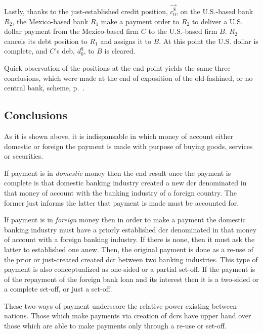 Lastly, thanks to the just-established credit position, $\overrightarrow{c^{\$}_{0}}$, on the U.S.-based bank $R_2$, the Mexico-based bank $R_1$ make a payment order to $R_2$ to deliver a U.S. dollar payment from the Mexico-based firm $C$ to the U.S.-based firm $B$. $R_2$ cancels its debt position to $R_1$ and assigns it to $B$. At this point the U.S. dollar is complete, and $C$'s deb, $d^{\$}_0$, to $B$ is cleared.

Quick observation of the positions at the end point yields the same three conclusions, which were made at the end of exposition of the old-fashined, or no central bank, scheme, p.~\pageref{tag1}.    

\subsection{Conclusions}

As it is shown above, it is indispansable in which money of account either domestic or foreign the payment is made with purpose of buying goods, services or securities. 

If payment is in \textit{domestic} money then the end result once the payment is complete is that domestic banking industry created a new \acf{dcr} denominated in that money of account with the banking industry of a foreign country. The former just informs the latter that payment is made must be accounted for. 

If payment is in \textit{foreign} money then in order to make a payment the domestic banking industry must have a priorly established \ac{dcr} denominated in that money of account with a foreign banking industry. If there is none, then it must ask the latter to established one anew. Then, the original payment is done as a re-use of the prior or just-created created \ac{dcr} between two banking industries. This type of payment is also conceptualized as one-sided or a partial set-off. If the payment is of the repayment of the foreign bank loan and its interest then it is a two-sided or a complete set-off, or just a set-off. 

These two ways of payment underscore the relative power existing between nations. Those which make payments via creation of \acp{dcr} have upper hand over those which are able to make payments only through a re-use or set-off.  
